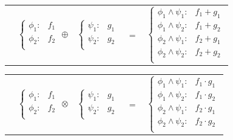 \documentclass[twoside,11pt]{article}
\begin{document}
{%
\begin{center}
\begin{tabular}{r c c c l}
&
\hspace{-6mm} 
  $\begin{cases}
    \phi_1: & f_1 \\ 
    \phi_2: & f_2 \\ 
  \end{cases}$
$\oplus$
&
\hspace{-4mm}
  $\begin{cases}
    \psi_1: & g_1 \\ 
    \psi_2: & g_2 \\ 
  \end{cases}$
&
\hspace{-2mm} 
$ = $
&
\hspace{-2mm}
  $\begin{cases}
  \phi_1 \wedge \psi_1: & f_1 + g_1 \\ 
  \phi_1 \wedge \psi_2: & f_1 + g_2 \\ 
  \phi_2 \wedge \psi_1: & f_2 + g_1 \\ 
  \phi_2 \wedge \psi_2: & f_2 + g_2 \\ 
  \end{cases}$
\end{tabular}
\vspace{4mm}
\hspace{-2mm}

\hspace{-2mm}
\begin{tabular}{r c c c l}
&
\hspace{-6mm} 
  $\begin{cases}
    \phi_1: & f_1 \\ 
    \phi_2: & f_2 \\ 
  \end{cases}$
$\otimes$
&
\hspace{-4mm}
  $\begin{cases}
    \psi_1: & g_1 \\ 
    \psi_2: & g_2 \\ 
  \end{cases}$
&
\hspace{-2mm} 
$ = $
&
\hspace{-2mm}
  $\begin{cases}
  \phi_1 \wedge \psi_1: & f_1 \cdot g_1 \\ 
  \phi_1 \wedge \psi_2: & f_1 \cdot g_2 \\ 
  \phi_2 \wedge \psi_1: & f_2 \cdot g_1 \\ 
  \phi_2 \wedge \psi_2: & f_2 \cdot g_2 \\ 
  \end{cases}$
\end{tabular}
\vspace{4mm}
\hspace{-2mm}


\end{center}}
\end{document}
